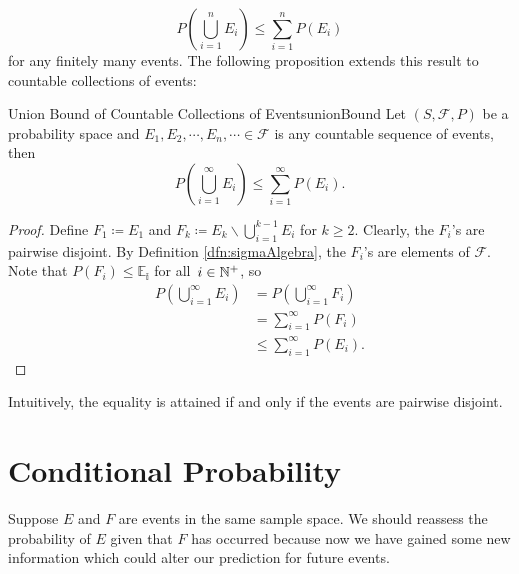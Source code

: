 \documentclass[math, code]{amznotes}
\theoremstyle{remark}
\begin{document}
\begin{equation*}
    P\left(\bigcup_{i = 1}^{n}E_i\right) \leq \sum_{i = 1}^{n}P\left(E_i\right)
\end{equation*}
for any finitely many events. The following proposition extends this result to countable collections of events:
\begin{probox}{Union Bound of Countable Collections of Events}{unionBound}
    Let $\left(S, \mathcal{F}, P\right)$ be a probability space and $E_1, E_2, \cdots, E_n, \cdots \in \mathcal{F}$ is any countable sequence of events, then 
    \begin{equation*}
        P\left(\bigcup_{i = 1}^{\infty}E_i\right) \leq \sum_{i = 1}^{\infty}P\left(E_i\right).
    \end{equation*}
    \tcblower
    \begin{proof}
        Define $F_1 \coloneqq E_1$ and $F_k \coloneqq E_k \backslash \bigcup_{i = 1}^{k - 1}E_i$ for $k \geq 2$. Clearly, the $F_i$'s are pairwise disjoint. By Definition \ref{dfn:sigmaAlgebra}, the $F_i$'s are elements of $\mathcal{F}$. Note that $P\left(F_i\right) \leq \mathbb{E_i}$ for all~$i \in \mathbb{N}^+$, so 
        \begin{align*}
            P\left(\bigcup_{i = 1}^{\infty}E_i\right) & = P\left(\bigcup_{i = 1}^{\infty}F_i\right) \\
            & = \sum_{i = 1}^{\infty}P\left(F_i\right) \\
            & \leq \sum_{i = 1}^{\infty}P\left(E_i\right).
        \end{align*}
    \end{proof}
\end{probox}
Intuitively, the equality is attained if and only if the events are pairwise disjoint. 
\section{Conditional Probability}
Suppose $E$ and $F$ are events in the same sample space. We should reassess the probability of $E$ given that $F$ has occurred because now we have gained some new information which could alter our prediction for future events.
\end{document}
